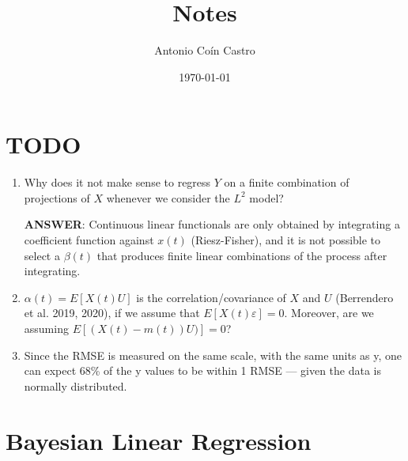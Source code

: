 \documentclass[
  a4paper,
	fontsize=11pt, %
	twoside=false, %
  secnumdepth=2,
	numbers=noenddot, %
]{kaohandt}
\begin{document}
\title{Notes}
\author[FM]{Antonio Coín Castro}
\date{\today}
\maketitle

\margintoc[*-7]

\section{TODO}

\begin{enumerate}

\item Why does it not make sense to regress \(Y\) on a finite combination of projections of \(X\) whenever we consider the \(L^2\) model?

\textbf{ANSWER}: Continuous linear functionals are only obtained by integrating a coefficient function against $x(t)$ (Riesz-Fisher), and it is not possible to select a $\beta(t)$ that produces finite linear combinations of the process after integrating.

\item \(\alpha(t)=E [X(t)U]\) is the correlation/covariance of $X$ and $U$ (Berrendero et al. 2019, 2020), if we assume that $E[X(t) \varepsilon]=0$. Moreover, are we assuming $E[(X(t) - m(t))U)]=0$?

\item Since the RMSE is measured on the same scale, with the same units as y, one can expect 68\% of the y values to be within 1 RMSE — given the data is normally distributed.

\end{enumerate}


\section{Bayesian Linear Regression}

\end{document}
